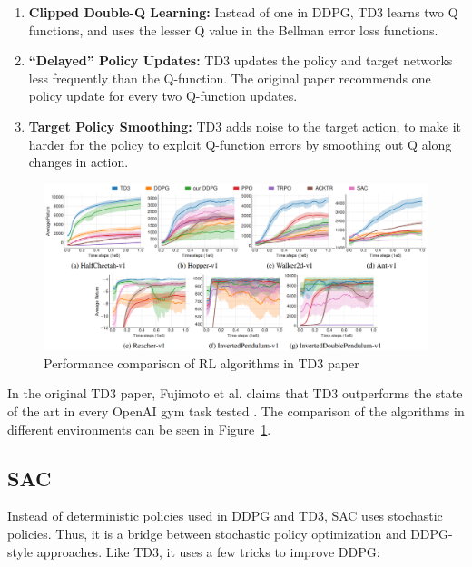 \documentclass[12pt,twoside]{report}
\begin{document}
\begin{enumerate}
  \item \textbf{Clipped Double-Q Learning:} Instead of one in DDPG, TD3 learns two Q functions, and uses the lesser Q value in the Bellman error loss functions.
  \item \textbf{“Delayed” Policy Updates:} TD3 updates the policy and target networks less frequently than the Q-function. The original paper recommends one policy update for every two Q-function updates.
  \item \textbf{Target Policy Smoothing:} TD3 adds noise to the target action, to make it harder for the policy to exploit Q-function errors by smoothing out Q along changes in action.
\end{enumerate}

\begin{figure}[h]
\centering
\includegraphics[width = \hsize]{figures/td3 comparison.png}
\caption{Performance comparison of RL algorithms in TD3 paper \cite{td3}}
\label{fig:td3-comparisons}
\end{figure}

In the original TD3 paper, Fujimoto et al. claims that TD3 outperforms the state of the art in every OpenAI gym task tested \cite{td3}. The comparison of the algorithms in different environments can be seen in Figure~\ref{fig:td3-comparisons}.

\subsection{SAC}
Instead of deterministic policies used in DDPG and TD3, SAC uses stochastic policies. Thus, it is a bridge between stochastic policy optimization and DDPG-style approaches. Like TD3, it uses a few tricks to improve DDPG: \cite{openai:sac}
\end{document}
